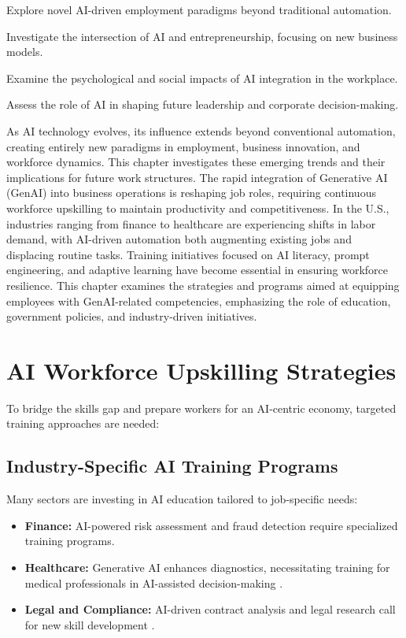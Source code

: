\documentclass[a4paper,headinclude=on,footinclude=on,12pt,oneside]{scrbook}
\begin{document}
\begin{arrows}
	\item Explore novel AI-driven employment paradigms beyond traditional automation.
	\item Investigate the intersection of AI and entrepreneurship, focusing on new business models.
	\item Examine the psychological and social impacts of AI integration in the workplace.
	\item Assess the role of AI in shaping future leadership and corporate decision-making.
\end{arrows}


As AI technology evolves, its influence extends beyond conventional automation, creating entirely new paradigms in employment, business innovation, and workforce dynamics. This chapter investigates these emerging trends and their implications for future work structures.
The rapid integration of Generative AI (GenAI) into business operations is reshaping job roles, requiring continuous workforce upskilling to maintain productivity and competitiveness. In the U.S., industries ranging from finance to healthcare are experiencing shifts in labor demand, with AI-driven automation both augmenting existing jobs and displacing routine tasks. Training initiatives focused on AI literacy, prompt engineering, and adaptive learning have become essential in ensuring workforce resilience. This chapter examines the strategies and programs aimed at equipping employees with GenAI-related competencies, emphasizing the role of education, government policies, and industry-driven initiatives.


\section{AI Workforce Upskilling Strategies}

To bridge the skills gap and prepare workers for an AI-centric economy, targeted training approaches are needed:

\subsection{Industry-Specific AI Training Programs}

Many sectors are investing in AI education tailored to job-specific needs:
\begin{itemize}
	\item \textbf{Finance:} AI-powered risk assessment and fraud detection require specialized training programs.
	\item \textbf{Healthcare:} Generative AI enhances diagnostics, necessitating training for medical professionals in AI-assisted decision-making .
	\item \textbf{Legal and Compliance:} AI-driven contract analysis and legal research call for new skill development .
\end{itemize}
\end{document}
